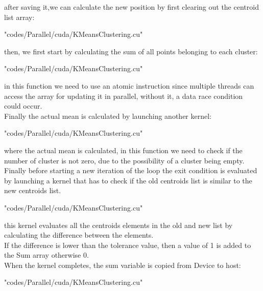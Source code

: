\documentclass[10pt,twocolumn,letterpaper]{article}
\begin{document}
after saving it,we can calculate the new position by first clearing out the centroid list array:\\
\begin{lstinputlisting}[language=C,style=CSnippetStyle,caption=CUDA Centroid Position Update,firstline=179,lastline=180]{
	"codes/Parallel/cuda/KMeansClustering.cu"}
\end{lstinputlisting}
then, we first start by calculating the sum of all points belonging to each cluster:\\
\begin{lstinputlisting}[language=C,style=CSnippetStyle,caption=CUDA Mean Sum Calculation,firstline=46,lastline=59]{
	"codes/Parallel/cuda/KMeansClustering.cu"}
\end{lstinputlisting}
in this function we need to use an atomic instruction since multiple threads can access the array for updating it in parallel, without 
it, a data race condition could occur.\\
Finally the actual mean is calculated by launching another kernel:\\
\begin{lstinputlisting}[language=C,style=CSnippetStyle,caption=CUDA Mean Calculation,firstline=33,lastline=45]{
	"codes/Parallel/cuda/KMeansClustering.cu"}
\end{lstinputlisting}
where the actual mean is calculated, in this function we need to check if the number of cluster is not zero, due to the possibility of
a cluster being empty.\\
Finally before starting a new iteration of the loop the exit condition is evaluated by launching a kernel that has to check if the old
centroids list is similar to the new centroids list.\\
\begin{lstinputlisting}[language=C,style=CSnippetStyle,caption=CUDA Exit Condition Calculator Kernel,firstline=18,lastline=32]{
	"codes/Parallel/cuda/KMeansClustering.cu"}
\end{lstinputlisting}
this kernel evaluates all the centroids elements in the old and new list by calculating the difference between the elements.\\
If the difference is lower than the tolerance value, then a value of 1 is added to the Sum array otherwise 0.\\
When the kernel completes, the sum variable is copied from Device to host:\\
\begin{lstinputlisting}[language=C,style=CSnippetStyle,caption=CUDA Exit Condition Sum Copy,firstline=128,lastline=128]{
	"codes/Parallel/cuda/KMeansClustering.cu"}
\end{lstinputlisting}
\end{document}
